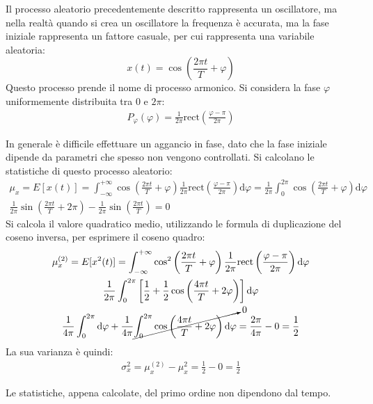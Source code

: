 \documentclass{article}
\newcommand{\rect}{\mathrm{rect}}
\newcommand{\df}{\mathrm{d}}
\numberwithin{equation}{subsection}
\begin{document}
Il processo aleatorio precedentemente descritto rappresenta un oscillatore, ma nella realtà quando si crea un oscillatore la frequenza è accurata, ma la fase iniziale rappresenta un fattore casuale,
per cui rappresenta una variabile aleatoria: 
\begin{equation*}
    x(t)=\displaystyle\cos\left(\frac{2\pi t}{T}+\varphi\right)
\end{equation*}
Questo processo prende il nome di processo armonico. Si considera la fase $\varphi$ uniformemente distribuita tra $0$ e $2\pi$:
\begin{gather*}
    P_{\varphi}(\varphi)=\displaystyle\frac{1}{2\pi}\rect\left(\frac{\varphi-\pi}{2\pi}\right)
\end{gather*}

In generale è difficile effettuare un aggancio in fase, dato che la fase iniziale dipende da parametri che spesso non vengono controllati. 
Si calcolano le statistiche di questo processo aleatorio:
\begin{gather*}
    \mu_{x}=E[x(t)]=\displaystyle\int_{-\infty}^{+\infty}\cos\left(\frac{2\pi t}{T}+\varphi\right)\frac{1}{2\pi}\rect\left(\frac{\varphi-\pi}{2\pi}\right)\df\varphi=\frac{1}{2\pi}\int_0^{2\pi}\cos\left(\frac{2\pi t}{T}+\varphi\right)\df\varphi\\
    \frac{1}{2\pi}\sin\left(\frac{2\pi t}{T}+2\pi\right)-\frac{1}{2\pi}\sin\left(\frac{2\pi t}{T}\right)=0
\end{gather*}
Si calcola il valore quadratico medio, utilizzando le formula di duplicazione del coseno inversa, per esprimere il coseno quadro:
\begin{gather*}
    \mu_{x}^{(2)}=E[x^2(t)]=\displaystyle\int_{-\infty}^{+\infty}\cos^2\left(\frac{2\pi t}{T}+\varphi\right)\frac{1}{2\pi}\rect\left(\frac{\varphi-\pi}{2\pi}\right)\df\varphi\\
    \frac{1}{2\pi}\int_0^{2\pi}\left[\frac{1}{2}+\frac{1}{2}\cos\left(\frac{4\pi t}{T}+2\varphi\right)\right]\df\varphi\\
    \frac{1}{4\pi}\int_0^{2\pi}\df\varphi+\frac{1}{4\pi}\cancelto{0}{\int_0^{2\pi}\cos\left(\frac{4\pi t}{T}+2\varphi\right)\df\varphi}=\frac{2\pi}{4\pi}-0=\frac{1}{2}
\end{gather*}
La sua varianza è quindi:
\begin{gather*}
    \sigma_x^2=\mu_x^{(2)}-\mu_x^2=\displaystyle\frac{1}{2}-0=\frac{1}{2}
\end{gather*}

Le statistiche, appena calcolate, del primo ordine non dipendono dal tempo. 
\end{document}
